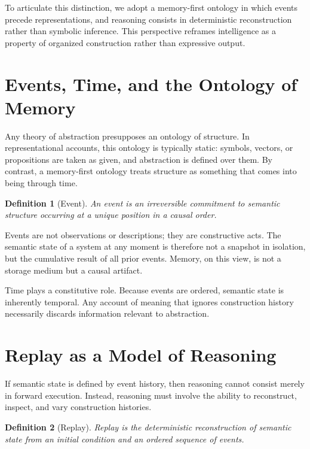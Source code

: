 \documentclass[11pt]{article}
\newtheorem{definition}{Definition}[section]
\begin{document}
To articulate this distinction, we adopt a memory-first ontology in which events precede representations, and reasoning consists in deterministic reconstruction rather than symbolic inference. This perspective reframes intelligence as a property of organized construction rather than expressive output.

\section{Events, Time, and the Ontology of Memory}

Any theory of abstraction presupposes an ontology of structure. In representational accounts, this ontology is typically static: symbols, vectors, or propositions are taken as given, and abstraction is defined over them. By contrast, a memory-first ontology treats structure as something that comes into being through time.

\begin{definition}[Event]
An event is an irreversible commitment to semantic structure occurring at a unique position in a causal order.
\end{definition}

Events are not observations or descriptions; they are constructive acts. The semantic state of a system at any moment is therefore not a snapshot in isolation, but the cumulative result of all prior events. Memory, on this view, is not a storage medium but a causal artifact.

Time plays a constitutive role. Because events are ordered, semantic state is inherently temporal. Any account of meaning that ignores construction history necessarily discards information relevant to abstraction.

\section{Replay as a Model of Reasoning}

If semantic state is defined by event history, then reasoning cannot consist merely in forward execution. Instead, reasoning must involve the ability to reconstruct, inspect, and vary construction histories.

\begin{definition}[Replay]
Replay is the deterministic reconstruction of semantic state from an initial condition and an ordered sequence of events.
\end{definition}
\end{document}
